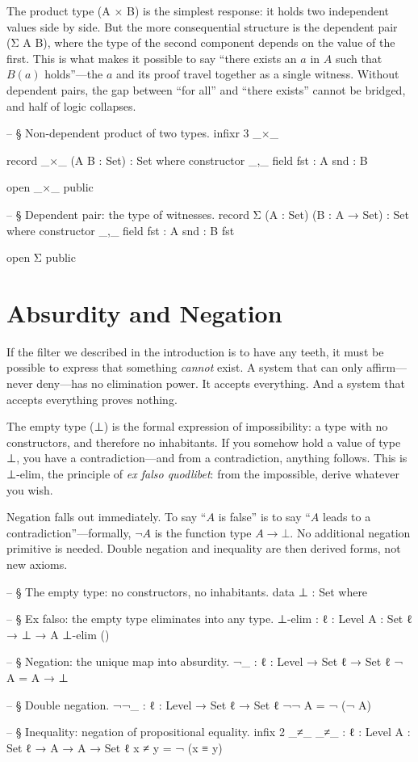 \documentclass[11pt,a4paper]{book}
\def\texttt#1{#1}%
\begin{document}
The product type (\texttt{A × B}) is the simplest response: it holds two independent values side by side. But the more consequential structure is the dependent pair (\texttt{Σ A B}), where the type of the second component depends on the value of the first. This is what makes it possible to say ``there exists an $a$ in $A$ such that $B(a)$ holds''—the $a$ and its proof travel together as a single witness. Without dependent pairs, the gap between ``for all'' and ``there exists'' cannot be bridged, and half of logic collapses.

\begin{code}
-- § Non-dependent product of two types.
infixr 3 _×_

record _×_ (A B : Set) : Set where
  constructor _,_
  field
    fst : A
    snd : B

open _×_ public

-- § Dependent pair: the type of witnesses.
record Σ (A : Set) (B : A → Set) : Set where
  constructor _,_
  field
    fst : A
    snd : B fst

open Σ public
\end{code}

\section{Absurdity and Negation}

If the filter we described in the introduction is to have any teeth, it must be possible to express that something \textit{cannot} exist. A system that can only affirm—never deny—has no elimination power. It accepts everything. And a system that accepts everything proves nothing.

The empty type (\texttt{⊥}) is the formal expression of impossibility: a type with no constructors, and therefore no inhabitants. If you somehow hold a value of type \texttt{⊥}, you have a contradiction—and from a contradiction, anything follows. This is \texttt{⊥-elim}, the principle of \textit{ex falso quodlibet}: from the impossible, derive whatever you wish.

Negation falls out immediately. To say ``$A$ is false'' is to say ``$A$ leads to a contradiction''—formally, $\neg A$ is the function type $A \to \bot$. No additional negation primitive is needed. Double negation and inequality are then derived forms, not new axioms.

\begin{code}
-- § The empty type: no constructors, no inhabitants.
data ⊥ : Set where

-- § Ex falso: the empty type eliminates into any type.
⊥-elim : {ℓ : Level} {A : Set ℓ} → ⊥ → A
⊥-elim ()

-- § Negation: the unique map into absurdity.
¬_ : {ℓ : Level} → Set ℓ → Set ℓ
¬ A = A → ⊥

-- § Double negation.
¬¬_ : {ℓ : Level} → Set ℓ → Set ℓ
¬¬ A = ¬ (¬ A)

-- § Inequality: negation of propositional equality.
infix 2 _≠_
_≠_ : {ℓ : Level} {A : Set ℓ} → A → A → Set ℓ
x ≠ y = ¬ (x ≡ y)
\end{code}
\end{document}
